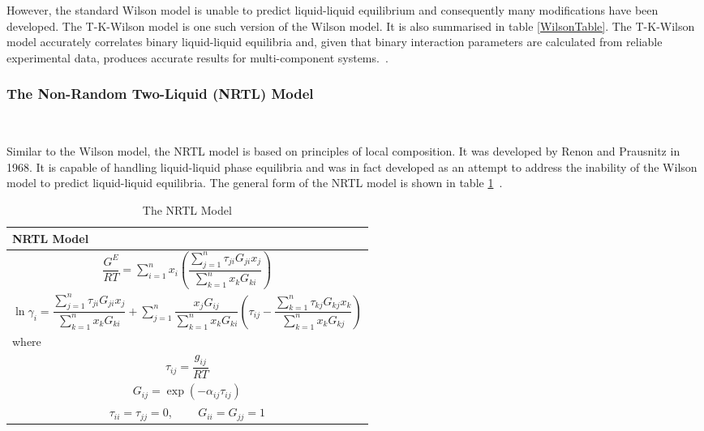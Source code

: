 However, the standard Wilson model is unable to predict liquid-liquid equilibrium and consequently many modifications have been developed. The T-K-Wilson model is one such version of the Wilson model. It is also summarised in table \ref{WilsonTable}. The T-K-Wilson model accurately correlates binary liquid-liquid equilibria and, given that binary interaction parameters are calculated from reliable experimental data, produces accurate results for multi-component systems.~\cite{ThermophysicalProperties, ModifiedWilson}.\


\subsubsection{The Non-Random Two-Liquid (NRTL) Model}\

Similar to the Wilson model, the NRTL model is based on principles of local composition. It was developed by Renon and Prausnitz in 1968. It is capable of handling liquid-liquid phase equilibria and was in fact developed as an attempt to address the inability of  the Wilson model to predict liquid-liquid equilibria. The general form of the NRTL model is shown in table \ref{NRTLTable}~\cite{Dechema, ThermophysicalProperties, ThermodynamicModels, ActivityCoefficientModelApplicationNRTL, LocalCompositionModels, StabilityAnalysis, ReliableComputationBinaryParams}.\\

\begin{table}
			\caption{The NRTL Model}\label{NRTLTable}
			\begin{center}
			\begin{tabularx}{\textwidth}{Xc}
			\hline
			\textbf{NRTL Model}&\\
			\hline
			\multicolumn{2}{c}{$ \dfrac{G^{E}}{RT} = \sum_{i= 1}^{n} x_{i} \left(\dfrac{\sum_{j= 1}^{n}\tau_{ji}G_{ji}x_{j}}{\sum_{k=1}^{n}x_{k}G_{ki}}\right)$}\\
			\multicolumn{2}{c}{$ \ln \gamma_{i} = \dfrac{\sum_{j= 1}^{n}\tau_{ji}G_{ji}x_{j}}{\sum_{k=1}^{n}x_{k}G_{ki}} + \sum_{j=1}^{n} \dfrac{x_{j}G_{ij}}{\sum_{k=1}^{n}x_{k}G_{ki}} \left(\tau_{ij} - \dfrac{\sum_{k= 1}^{n}\tau_{kj}G_{kj}x_{k}}{\sum_{k=1}^{n}x_{k}G_{kj}}\right)$}\\
			where&\\
			\multicolumn{2}{c}{$ \tau_{ij} = \dfrac{g_{ij}}{RT}$}\\
			\multicolumn{2}{c}{$ G_{ij} = \exp\left(-\alpha_{ij}\tau_{ij}\right)$}\\
			\multicolumn{2}{c}{$\tau_{ii} = \tau_{jj} = 0$, $\qquad G_{ii}=G_{jj} =1 $}\\			
			\hline
			\end{tabularx}
			\end{center}
\end{table}

